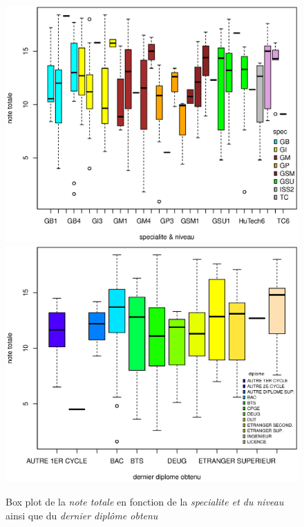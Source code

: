 \documentclass{article}
\begin{document}
\begin{figure}[H] %

\centering
\includegraphics[scale=0.36]{./img/boxplot_spec_niv_res.eps}
\includegraphics[scale=0.36]{./img/boxplot_dipl_res.eps}
\caption{Box plot de la \textit{note totale} en fonction de la \textit{specialite et du niveau} ainsi que du \textit{dernier diplôme obtenu}}
\label{anx2}
\end{figure}
\end{document}
